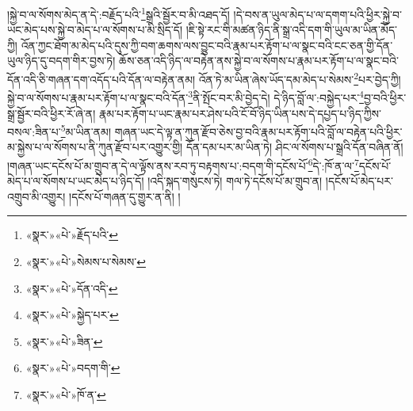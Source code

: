 །སྐྱེ་བ་ལ་སོགས་མེད་ན་དེ་:བརྗོད་པའི་\footnote{«སྣར་»«པེ་»རྗོད་པའི་}སྒྲའི་སྦྱོར་བ་མི་འཐད་དོ། །དེ་བས་ན་ཡུལ་མེད་པ་ལ་དགག་པའི་ཕྱིར་སྐྱེ་བ་ཡང་མེད་པས་སྐྱེ་བ་མེད་པ་ལ་སོགས་པ་མི་སྲིད་དོ། །ཇི་སྟེ་རང་གི་མཚན་ཉིད་ནི་སྒྲ་འདི་དག་གི་ཡུལ་མ་ཡིན་མོད་ཀྱི། འོན་ཀྱང་ཐོག་མ་མེད་པའི་དུས་ཀྱི་བག་ཆགས་ལས་བྱུང་བའི་རྣམ་པར་རྟོག་པ་ལ་སྣང་བའི་ངང་ཅན་གྱི་དོན་ཡུལ་ཉིད་དུ་བདག་གིར་བྱས་ཏེ། ཆོས་ཅན་འདི་ཉིད་ལ་བརྟེན་ནས་སྐྱེ་བ་ལ་སོགས་པ་རྣམ་པར་རྟོག་པ་ལ་སྣང་བའི་དོན་འདི་ཅི་གཞན་དག་འདོད་པའི་དོན་ལ་བརྟེན་ནམ། འོན་ཏེ་མ་ཡིན་ཞེས་ཡོད་དམ་མེད་པ་སེམས་\footnote{«སྣར་»«པེ་»སེམས་པ་སེམས་}པར་བྱེད་ཀྱི། སྐྱེ་བ་ལ་སོགས་པ་རྣམ་པར་རྟོག་པ་ལ་སྣང་བའི་དོན་\footnote{«སྣར་»«པེ་»དོན་འདི་}ནི་སྤོང་བར་མི་བྱེད་དེ། དེ་ཉིད་བློ་ལ་:བསྐྱེད་པར་\footnote{«སྣར་»«པེ་»སྐྱེད་པར་}བྱ་བའི་ཕྱིར་སྒྲ་སྦྱོར་བའི་ཕྱིར་རོ་ཞེ་ན། རྣམ་པར་རྟོག་པ་ཡང་རྣམ་པར་ཤེས་པའི་ངོ་བོ་ཉིད་ཡིན་པས་དེ་དཔྱད་པ་ཉིད་ཀྱིས་བསལ་:ཟིན་པ་\footnote{«སྣར་»«པེ་»ཟིན་}མ་ཡིན་ནམ། གཞན་ཡང་དེ་ལྟ་ན་ཀུན་རྫོབ་ཅེས་བྱ་བའི་རྣམ་པར་རྟོག་པའི་བློ་ལ་བརྟེན་པའི་ཕྱིར་མ་སྐྱེས་པ་ལ་སོགས་པ་ནི་ཀུན་རྫོབ་པར་འགྱུར་གྱི། དོན་དམ་པར་མ་ཡིན་ཏེ། ཤིང་ལ་སོགས་པ་སྒྲའི་དོན་བཞིན་ནོ། །གཞན་ཡང་དངོས་པོ་མ་གྲུབ་ན་དེ་ལ་ལྟོས་ནས་རབ་ཏུ་བརྟགས་པ་:བདག་གི་དངོས་པོ་\footnote{«སྣར་»«པེ་»བདག་གི་}དེ་:ཁོ་ན་ལ་\footnote{«སྣར་»«པེ་»ཁོ་ན་}དངོས་པོ་མེད་པ་ལ་སོགས་པ་ཡང་མེད་པ་ཉིད་དོ། །འདི་སྐད་གསུངས་ཏེ། གལ་ཏེ་དངོས་པོ་མ་གྲུབ་ན། །དངོས་པོ་མེད་པར་འགྲུབ་མི་འགྱུར། །དངོས་པོ་གཞན་དུ་གྱུར་ན་ནི། །
